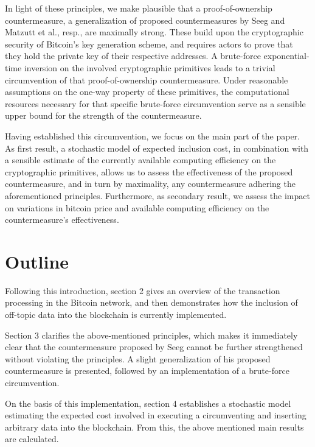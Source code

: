 \documentclass[a4paper,11pt,titlepage]{scrbook}
\begin{document}
In light of these principles, we make plausible that a proof-of-ownership countermeasure, a generalization of proposed countermeasures by Seeg and Matzutt et al.\@, resp., are maximally strong. 
These build upon the cryptographic security of Bitcoin's key generation scheme, and requires actors to prove that they hold the private key of their respective addresses.
A brute-force exponential-time inversion on the involved cryptographic primitives leads to a trivial circumvention of that proof-of-ownership countermeasure.
Under reasonable assumptions on the one-way property of these primitives,
the computational resources necessary for that specific brute-force circumvention serve as a sensible upper bound for the strength of the countermeasure.

Having established this circumvention, we focus on the main part of the paper.
As first result, a stochastic model of expected inclusion cost, in combination with a sensible estimate of the currently available computing efficiency on the cryptographic primitives, allows us to assess the effectiveness of the proposed countermeasure, and in turn by maximality, any countermeasure adhering the aforementioned principles.
Furthermore, as secondary result, we assess the impact on variations in bitcoin price and available computing efficiency on the countermeasure's effectiveness.



\section{Outline}

Following this introduction, section 2 gives an overview of the transaction processing in the Bitcoin network, and then demonstrates how the inclusion of off-topic data into the blockchain is currently implemented.

Section 3 clarifies the above-mentioned principles, which makes it immediately clear that the countermeasure proposed by Seeg cannot be further strengthened without violating the principles.
A slight generalization of his proposed countermeasure is presented, followed by an implementation of a brute-force circumvention.

On the basis of this implementation, section 4 establishes a stochastic model estimating the expected cost involved in executing a circumventing and inserting arbitrary data into the blockchain.
From this, the above mentioned main results are calculated.
\end{document}
